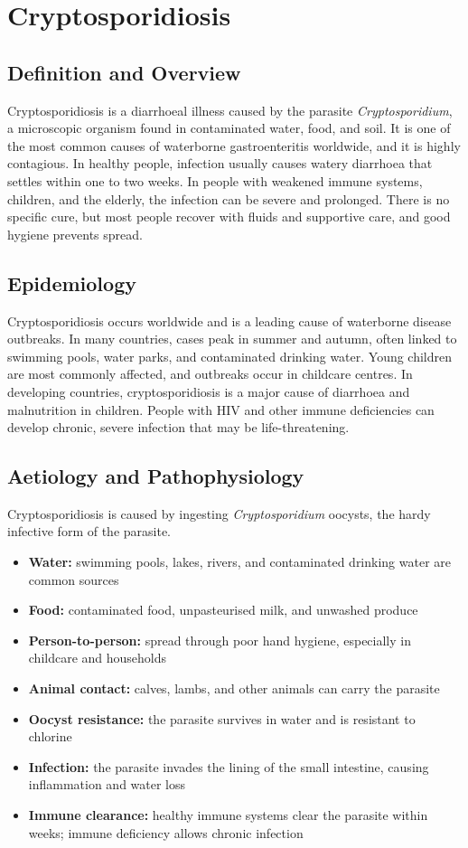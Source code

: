 \chapter{Cryptosporidiosis}

\section*{Definition and Overview}
Cryptosporidiosis is a diarrhoeal illness caused by the parasite \textit{Cryptosporidium}, a microscopic organism found in contaminated water, food, and soil. It is one of the most common causes of waterborne gastroenteritis worldwide, and it is highly contagious. In healthy people, infection usually causes watery diarrhoea that settles within one to two weeks. In people with weakened immune systems, children, and the elderly, the infection can be severe and prolonged. There is no specific cure, but most people recover with fluids and supportive care, and good hygiene prevents spread.

\section*{Epidemiology}
Cryptosporidiosis occurs worldwide and is a leading cause of waterborne disease outbreaks. In many countries, cases peak in summer and autumn, often linked to swimming pools, water parks, and contaminated drinking water. Young children are most commonly affected, and outbreaks occur in childcare centres. In developing countries, cryptosporidiosis is a major cause of diarrhoea and malnutrition in children. People with HIV and other immune deficiencies can develop chronic, severe infection that may be life-threatening.

\section*{Aetiology and Pathophysiology}
Cryptosporidiosis is caused by ingesting \textit{Cryptosporidium} oocysts, the hardy infective form of the parasite.

\begin{itemize}
    \item \textbf{Water:} swimming pools, lakes, rivers, and contaminated drinking water are common sources
    \item \textbf{Food:} contaminated food, unpasteurised milk, and unwashed produce
    \item \textbf{Person-to-person:} spread through poor hand hygiene, especially in childcare and households
    \item \textbf{Animal contact:} calves, lambs, and other animals can carry the parasite
    \item \textbf{Oocyst resistance:} the parasite survives in water and is resistant to chlorine
    \item \textbf{Infection:} the parasite invades the lining of the small intestine, causing inflammation and water loss
    \item \textbf{Immune clearance:} healthy immune systems clear the parasite within weeks; immune deficiency allows chronic infection
\end{itemize}

